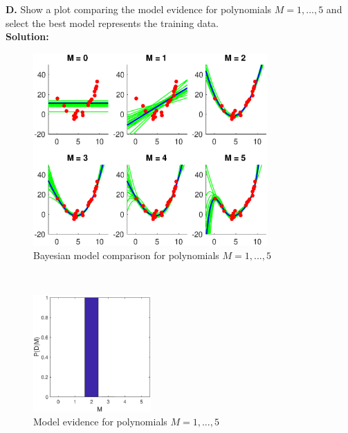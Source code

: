 \documentclass{article}
\newcommand{\figurewidth}{0.4\textwidth}
\newcommand{\widefigurewidth}{0.8\textwidth}
\begin{document}
\newpage
\textbf{D. } Show a plot comparing the model evidence for polynomials $M = 1, ..., 5$ and select the best model represents the training data. \\
\textbf{Solution:} \\
\begin{figure}[h!]
\centering
\includegraphics[width=\widefigurewidth]{fig/P7d1.eps}
\caption{Bayesian model comparison for polynomials $M = 1,...,5$}
\end{figure}\\

\begin{figure}[h!]
\centering
\includegraphics[width=\figurewidth]{fig/P7d2.eps}
\caption{Model evidence for polynomials $M = 1,...,5$}
\end{figure}
\end{document}
